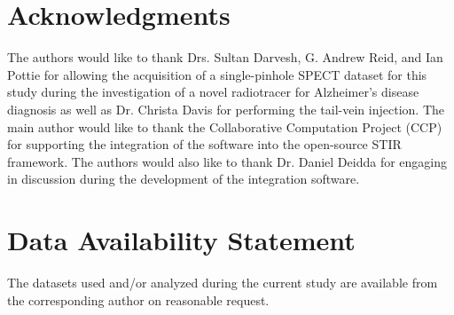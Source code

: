 \documentclass[utf8]{FrontiersinHarvard} %
\begin{document}

\section*{Acknowledgments}
The authors would like to thank Drs. Sultan Darvesh, G. Andrew Reid, and Ian Pottie for allowing the acquisition of a single-pinhole SPECT dataset for this study during the investigation of a novel radiotracer for Alzheimer's disease diagnosis as well as Dr. Christa Davis for performing the tail-vein injection. The main author would like to thank the Collaborative Computation Project (CCP) for supporting the integration of the software into the open-source STIR framework. The authors would also like to thank Dr. Daniel Deidda for engaging in discussion during the development of the integration software.



\section*{Data Availability Statement}
The datasets used and/or analyzed during the current study are available from the corresponding author on reasonable request.




\end{document}
